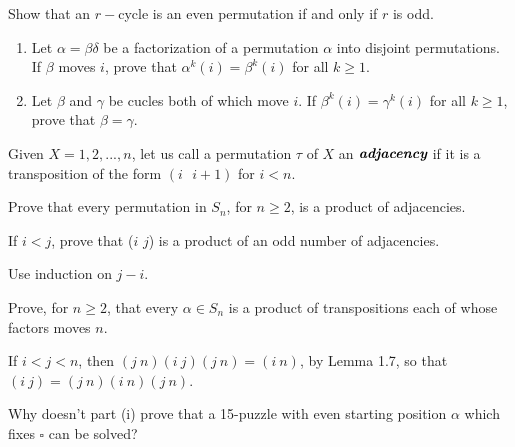 \documentclass[12pt]{article}
\newenvironment{exercise}[2][Exercise]{\begin{trivlist}
\item[\hskip \labelsep {\bfseries #1}\hskip \labelsep {\bfseries #2.}]}
{\end{trivlist}}
\newenvironment{hint}[2][Hint]{\begin{trivlist}
    \item[\hskip \labelsep {\bfseries #1}\hskip \labelsep {\bfseries #2.}]}
    {\end{trivlist}}
\begin{document}
\begin{exercise}{1.14}

    Show that an $r-$cycle is an even permutation if and only if $r$ is odd.
\end{exercise}



\begin{exercise}{1.15}
    \begin{enumerate}
        \item[(i)] Let $\alpha = \beta\delta$ be a factorization of a permutation $\alpha$ into disjoint permutations. If $\beta$ moves $i$, prove that $\alpha^k(i) = \beta^k(i)$ for all $k \geq 1$.
        
        \item[(ii)] Let $\beta$ and $\gamma$ be cucles both of which move $i$. If $\beta^k(i) = \gamma^k(i)$ for all $k\geq 1$, prove that $\beta = \gamma$.
    \end{enumerate}
    
\end{exercise}



\begin{exercise}{1.16}

    Given $X={1,2,...,n}$, let us call a permutation $\tau$ of $X$ an $\textit{\textbf{adjacency}}$ if it is a transposition of the form $(i \text{ }i+1)$ for $i<n$.
    \begin{enumerate}
        \item[(i)] Prove that every permutation in $S_n$, for $n\geq2$, is a product of adjacencies.
        \item[(ii)] If $i<j$, prove that ($i$ $j$) is a product of an odd number of adjacencies.
        \begin{hint}{}
            Use induction on $j-i$.
        \end{hint}
    \end{enumerate}

    
\end{exercise}



\begin{exercise}{1.17}
    \begin{enumerate}
        \item[(i)] Prove, for $n\geq2$, that every $\alpha\in S_n$ is a product of transpositions each of whose factors moves $n$.
        \begin{hint}{} 
            If $i<j<n$, then $(j\:n)(i\:j)(j\:n) = (i\:n)$, by Lemma 1.7, so that $(i\:j) = (j\:n)(i\:n)(j\:n)$.
        \end{hint}
        \item[(ii)] Why doesn't part (i) prove that a 15-puzzle with even starting position $\alpha$ which fixes $\square$ can be solved?
    \end{enumerate}
    
\end{exercise}
\end{document}

